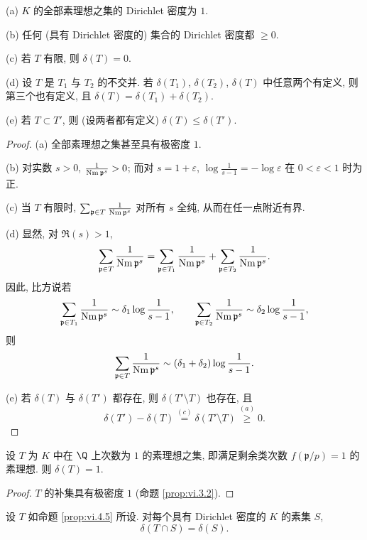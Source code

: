 \begin{proposition}\label{prop:vi.4.4}
(a) $K$ 的全部素理想之集的 Dirichlet 密度为 $1$.

(b) 任何 (具有 Dirichlet 密度的) 集合的 Dirichlet 密度都 $\ge0$.

(c) 若 $T$ 有限, 则 $\delta(T)=0$.

(d) 设 $T$ 是 $T_1$ 与 $T_2$ 的不交并. 若 $\delta(T_1)$, $\delta(T_2)$, $\delta(T)$ 中任意两个有定义, 则第三个也有定义, 且 $\delta(T)=\delta(T_1)+\delta(T_2)$.

(e) 若 $T\subset T'$, 则 (设两者都有定义) $\delta(T)\le\delta(T')$.
\end{proposition}

\begin{proof}
(a) 全部素理想之集甚至具有极密度 $1$.

(b) 对实数 $s>0$, $\frac{1}{\operatorname{Nm}\mathfrak{p}^{s}}>0$; 而对 $s=1+\varepsilon$, $\log\frac{1}{s-1}=-\log\varepsilon$ 在 $0<\varepsilon<1$ 时为正.

(c) 当 $T$ 有限时, $\sum_{\mathfrak{p}\in T}\frac{1}{\operatorname{Nm}\mathfrak{p}^{s}}$ 对所有 $s$ 全纯, 从而在任一点附近有界.

(d) 显然, 对 $\Re(s)>1$,
\[
\sum_{\mathfrak{p}\in T}\frac{1}{\operatorname{Nm}\mathfrak{p}^{s}}=\sum_{\mathfrak{p}\in T_{1}}\frac{1}{\operatorname{Nm}\mathfrak{p}^{s}}+\sum_{\mathfrak{p}\in T_{2}}\frac{1}{\operatorname{Nm}\mathfrak{p}^{s}}.
\]
因此, 比方说若
\[
\sum_{\mathfrak{p}\in T_{1}}\frac{1}{\operatorname{Nm}\mathfrak{p}^{s}}\sim\delta_{1}\log\frac{1}{s-1},\qquad\sum_{\mathfrak{p}\in T_{2}}\frac{1}{\operatorname{Nm}\mathfrak{p}^{s}}\sim\delta_{2}\log\frac{1}{s-1},
\]
则
\[
\sum_{\mathfrak{p}\in T}\frac{1}{\operatorname{Nm}\mathfrak{p}^{s}}\sim(\delta_{1}+\delta_{2})\log\frac{1}{s-1}.
\]

(e) 若 $\delta(T)$ 与 $\delta(T')$ 都存在, 则 $\delta(T'\setminus T)$ 也存在, 且
\[
\delta(T')-\delta(T)\overset{(c)}{=}\delta(T'\setminus T)\overset{(a)}{\ge}0.
\]
\end{proof}

\begin{proposition}\label{prop:vi.4.5}
设 $T$ 为 $K$ 中在 $\Q$ 上次数为 $1$ 的素理想之集, 即满足剩余类次数 $f(\mathfrak{p}/p)=1$ 的素理想. 则 $\delta(T)=1$.
\end{proposition}

\begin{proof}
$T$ 的补集具有极密度 $1$ (命题 \ref{prop:vi.3.2}).
\end{proof}

\begin{corollary}\label{cor:vi.4.6}
设 $T$ 如命题 \ref{prop:vi.4.5} 所设. 对每个具有 Dirichlet 密度的 $K$ 的素集 $S$,
\[
\delta(T\cap S)=\delta(S).
\]
\end{corollary}

